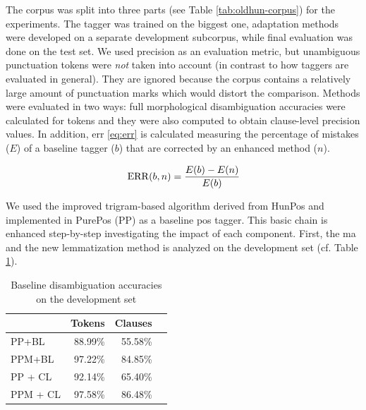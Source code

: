 The corpus was split into three parts (see Table \ref{tab:oldhun-corpus}) for the experiments. 
The tagger was trained on the biggest one, adaptation methods were developed on a separate development subcorpus, while final evaluation was done on the test set.
We used precision as an evaluation metric, but unambiguous punctuation tokens were \emph{not} taken into account (in contrast to how taggers are evaluated in general). 
They are ignored because the corpus contains a relatively large amount of punctuation marks which would distort the comparison.
Methods were evaluated in two ways: full morphological disambiguation accuracies were calculated for tokens and they were also computed to obtain clause-level precision values. 
In addition, \gls{err} \eqref{eq:err} is calculated measuring the percentage of mistakes ($E$) of a baseline tagger ($b$) that are corrected by an enhanced method ($n$). 

\begin{equation}\label{eq:err}
\operatorname{ERR}(b,n) = \frac{E(b)-E(n)}{E(b)}
\end{equation}

We used the improved trigram-based algorithm derived from HunPos and implemented in PurePos (PP) as a baseline \gls{pos} tagger. 
This basic chain is enhanced step-by-step investigating the impact of each component.
First, the \acrshort{ma} and the new lemmatization method is analyzed on the development set (cf. Table \ref{tab:oldhun-baselines}). 

\begin{table}[H]
\centering
\caption{Baseline disambiguation accuracies on the development set}\label{tab:oldhun-baselines}
\begin{tabular}{l r r r}
\hline
 & Tokens & Clauses \\
\hline
PP+BL  & 88.99\% & 55.58\% \\
PPM+BL  & 97.22\% & 84.85\% \\
PP + CL & 92.14\% & 65.40\% \\
PPM + CL & 97.58\% & 86.48\% \\
\hline
\end{tabular}
\end{table}


